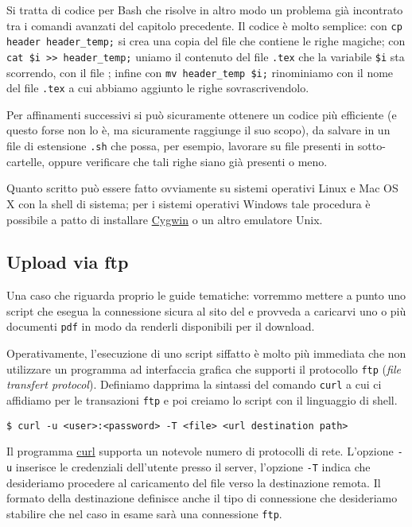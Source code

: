 Si tratta di codice per Bash che risolve in altro modo un problema già
incontrato tra i comandi avanzati del capitolo precedente. Il codice è molto
semplice: con \verb!cp header header_temp;! si crea una copia del file che
contiene le righe magiche; con \verb!cat $i >> header_temp;! uniamo il
contenuto del file \texttt{.tex} che la variabile \verb!$i! sta
scorrendo, con il file ; infine con
\verb!mv header_temp $i;! rinominiamo  con il nome del
file \texttt{.tex} a cui abbiamo aggiunto le righe sovrascrivendolo.

Per affinamenti successivi si può sicuramente ottenere un codice più efficiente
(e questo forse non lo è, ma sicuramente raggiunge il suo scopo), da salvare in
un file di estensione \texttt{.sh} che possa, per esempio, lavorare su file
presenti in sotto-cartelle, oppure verificare che tali righe siano già presenti
o meno.

Quanto scritto può essere fatto ovviamente su sistemi operativi Linux e Mac OS
X con la shell di sistema; per i sistemi operativi Windows tale procedura è
possibile a patto di installare \href{http://www.cygwin.com/}{Cygwin} o un
altro emulatore Unix.

\subsection{Upload via ftp}

Una caso che riguarda proprio le guide tematiche: vorremmo mettere a punto uno
script che esegua la connessione sicura al sito del \GuIT*{} e provveda a
caricarvi uno o più documenti \texttt{pdf} in modo da renderli disponibili per
il download.

Operativamente, l'esecuzione di uno script siffatto è molto più immediata che
non utilizzare un programma ad interfaccia grafica che supporti il protocollo
\texttt{ftp} (\emph{file transfert protocol}). Definiamo dapprima la sintassi
del comando \texttt{curl} a cui ci affidiamo per le transazioni \texttt{ftp} e
poi creiamo lo script con il linguaggio di shell.
\begin{Verbatim}
$ curl -u <user>:<password> -T <file> <url destination path>
\end{Verbatim}

Il programma \href{http://curl.haxx.se/}{curl} supporta un notevole numero di
protocolli di rete. L'opzione \texttt{-u} inserisce le credenziali dell'utente
presso il server, l'opzione \texttt{-T} indica che desideriamo procedere al
caricamento del file verso la destinazione remota. Il formato della destinazione
definisce anche il tipo di connessione che desideriamo stabilire che nel caso in
esame sarà una connessione \texttt{ftp}.

